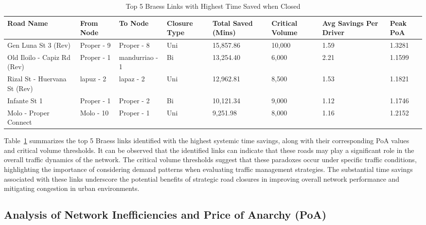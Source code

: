 {
\footnotesize
\setlength{\tabcolsep}{1.5pt}  
\begin{longtable}{|p{2.8cm}|p{1.8cm}|p{2.0cm}|p{1.2cm}|p{1.6cm}|p{1.5cm}|p{1.8cm}|p{1.5cm}|} 

\hline
\textbf{Road Name} & \textbf{From Node} & \textbf{To Node} & \textbf{Closure Type} & \textbf{Total Saved (Mins)} & \textbf{Critical Volume} & \textbf{Avg Savings Per Driver} & \textbf{Peak PoA} \\ \hline
\endfirsthead

\hline
\caption{Top 5 Braess Links with Highest Time Saved when Closed}
\label{tab:highest_time_saved}
\endlastfoot

Gen Luna St 3 (Rev) & Proper - 9 & Proper - 8 & Uni & 15,857.86 & 10,000 & 1.59 & 1.3281 \\ \hline
Old Iloilo - Capiz Rd (Rev) & Proper - 1 & mandurriao - 1 & Bi & 13,254.40 & 6,000 & 2.21 & 1.1599 \\ \hline
Rizal St - Huervana St (Rev) & lapuz - 2 & lapaz - 2 & Uni & 12,962.81 & 8,500 & 1.53 & 1.1821 \\ \hline
Infante St 1 & Proper - 1 & Proper - 2 & Bi & 10,121.34 & 9,000 & 1.12 & 1.1746 \\ \hline
Molo - Proper Connect & Molo - 10 & Proper - 1 & Uni & 9,251.98 & 8,000 & 1.16 & 1.2152 \\ \hline

\end{longtable}
}

Table~\ref{tab:highest_time_saved} summarizes the top 5 Braess links identified with the highest systemic time savings, along with their corresponding PoA values and critical volume thresholds. It can be observed that the identified links can indicate that these roads may play a significant role in the overall traffic dynamics of the network. The critical volume thresholds suggest that these paradoxes occur under specific traffic conditions, highlighting the importance of considering demand patterns when evaluating traffic management strategies. The substantial time savings associated with these links underscore the potential benefits of strategic road closures in improving overall network performance and mitigating congestion in urban environments.

\subsection{Analysis of Network Inefficiencies and Price of Anarchy (PoA)}
\label{sec:network_inefficiencies_PoA}

